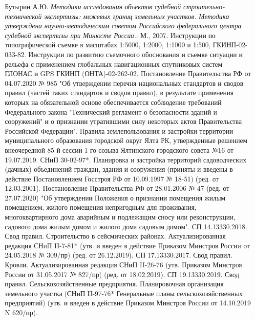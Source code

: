 \begin{thebibliography}{9}
Бутырин А.Ю. \textit{Методики исследования объектов судебной строительно-технической экспертизы: межевых границ земельных участков. Методика утверждена научно-методическим советом Российского федерального центра судебной экспертизы при Минюсте России.}. М., 2007.    
Инструкции по топографической съемке в масштабах 1:5000, 1:2000, 1:1000 и 1:500, ГКИНП-02-033-82.  
Инструкции по развитию съемочного обоснования и съемке ситуации и рельефа с применением глобальных навигационных спутниковых систем ГЛОНАС и GPS ГКИНП (ОНТА)-02-262-02.  
Постановление Правительства РФ от 04.07.2020 № 985 "Об утверждении перечня национальных стандартов и сводов правил (частей таких стандартов и сводов правил), в результате применения которых на обязательной основе обеспечивается соблюдение требований Федерального закона "Технический регламент о безопасности зданий и сооружений" и о признании утратившими силу некоторых актов Правительства Российской Федерации".  
Правила землепользования и застройки территории муниципального образования городской округ Ялта РК, утвержденные решением внеочередной 85-й сессии 1-го созыва Ялтинского городского совета №16 от 19.07.2019.  
СНиП 30-02-97*. Планировка и застройка территорий садоводческих (дачных) объединений граждан, здания и сооружения (приняты и введены в действие Постановлением Госстроя РФ от 10.09.1997 № 18-51) (ред. от 12.03.2001).  
Постановление Правительства РФ от 28.01.2006 № 47 (ред. от 27.07.2020) "Об утверждении Положения о признании помещения жилым помещением, жилого помещения непригодным для проживания, многоквартирного дома аварийным и подлежащим сносу или реконструкции, садового дома жилым домом и жилого дома садовым домом".  
СП 14.13330.2018. Свод правил. Строительство в сейсмических районах. Актуализированная редакция СНиП II-7-81* (утв. и введен в действие Приказом Минстроя России от 24.05.2018 № 309/пр) (ред. от 26.12.2019).  
СП 17.13330.2017. Свод правил. Кровли. Актуализированная редакция СНиП II-26-76 (утв. Приказом Минстроя России от 31.05.2017 № 827/пр) (ред. от 18.02.2019).  
СП 19.13330.2019. Свод правил. Сельскохозяйственные предприятия. Планировочная организация земельного участка (СНиП II-97-76* Генеральные планы сельскохозяйственных предприятий) (утв. и введен в действие Приказом Минстроя России от 14.10.2019 N 620/пр).  

\end{thebibliography}
